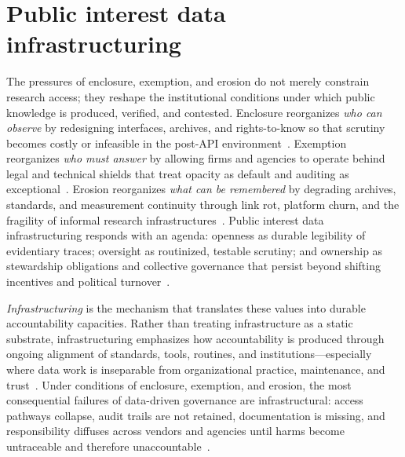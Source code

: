 \documentclass[acmsmall,screen]{acmart}
\begin{document}
\section*{Public interest data infrastructuring}
The pressures of enclosure, exemption, and erosion do not merely constrain research access; they reshape the institutional conditions under which public knowledge is produced, verified, and contested. Enclosure reorganizes \emph{who can observe} by redesigning interfaces, archives, and rights-to-know so that scrutiny becomes costly or infeasible in the post-API environment~\cite{Freelon_ComputationalResearchPostAPI_2018,Bruns_APIcalypsesocialmedia_2019,Puschmann_endwildwest_2019}. Exemption reorganizes \emph{who must answer} by allowing firms and agencies to operate behind legal and technical shields that treat opacity as default and auditing as exceptional~\cite{pasquale_black_2016,Halavais_Overcomingtermsservice_2019}. Erosion reorganizes \emph{what can be remembered} by degrading archives, standards, and measurement continuity through link rot, platform churn, and the fragility of informal research infrastructures~\cite{gaffney_caveat_2018,baumgartner_incompleteness_2018}. Public interest data infrastructuring responds with an agenda: openness as durable legibility of evidentiary traces; oversight as routinized, testable scrutiny; and ownership as stewardship obligations and collective governance that persist beyond shifting incentives and political turnover~\cite{vandervlist_APIGovernanceCase_2022}.

\textit{Infrastructuring} is the mechanism that translates these values into durable accountability capacities. Rather than treating infrastructure as a static substrate, infrastructuring emphasizes how accountability is produced through ongoing alignment of standards, tools, routines, and institutions---especially where data work is inseparable from organizational practice, maintenance, and trust~\cite{Plantin_Infrastructurestudiesmeet_2016,acker_DataCraftTheory_2019,passiTrustDataScience2018a}. Under conditions of enclosure, exemption, and erosion, the most consequential failures of data-driven governance are infrastructural: access pathways collapse, audit trails are not retained, documentation is missing, and responsibility diffuses across vendors and agencies until harms become untraceable and therefore unaccountable~\cite{passiTrustDataScience2018a,pasquale_black_2016}.
\end{document}
